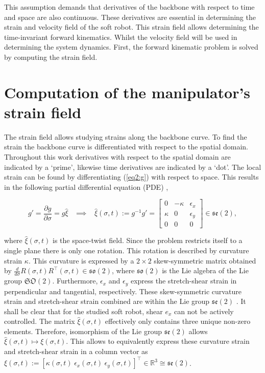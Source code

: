 This assumption demands that derivatives of the backbone with respect to time and space are also continuous. These derivatives are essential in determining the strain and velocity field of the soft robot. This strain field allows determining the time-invariant forward kinematics. Whilst the velocity field will be used in determining the system dynamics. First, the forward kinematic problem is solved by computing the strain field.



\section{Computation of the manipulator's strain field}

The strain field allows studying strains along the backbone curve. To find the strain the backbone curve is differentiated with respect to the spatial domain. Throughout this work derivatives with respect to the spatial domain are indicated by a `prime', likewise time derivatives are indicated by a `dot'. The local strain can be found by differentiating (\ref{eq2:g}) with respect to space. This results in the following partial differential equation (PDE) \cite{Caasenbrood2020}, 

\begin{equation}
   g' = \frac{\partial g}{\partial \sigma} = g \hat{\xi} \hspace{10pt} \implies \hspace{10pt}  \hat{\xi}(\sigma,t) := g^{-1}g' = \begin{bmatrix} 0 & -\kappa & \epsilon_x  \\ \kappa & 0 & \epsilon_y \\ 0 & 0 & 0 \end{bmatrix} \in  \mathfrak{se}(2),
    \label{eq2:dgdsigma}
\end{equation}

where $\hat{\xi}(\sigma,t)$ is the space-twist field. Since the problem restricts itself to a single plane there is only one rotation. This rotation is described by curvature strain $\kappa$. This curvature is expressed by a $2 \times 2$ skew-symmetric matrix obtained by $\frac{d}{d\sigma}R(\sigma,t)R^\top(\sigma,t) \in \mathfrak{so}(2)$, where $\mathfrak{so}(2)$ is the Lie algebra of the Lie group $\mathfrak{SO}(2)$. Furthermore, $\epsilon_x$ and $\epsilon_y$ express the stretch-shear strain in perpendicular and tangential, respectively. These skew-symmetric curvature strain and stretch-shear strain combined are within the Lie group $\mathfrak{se}(2)$ \cite{Sola2018}. It shall be clear that for the studied soft robot, shear $e_x$ can not be actively controlled. The matrix $\hat{\xi}(\sigma,t)$ effectively only contains three unique non-zero elements. Therefore, isomorphism of the Lie group $\mathfrak{se}(2)$ allows $\hat{\xi}(\sigma,t) \longmapsto \xi(\sigma,t)$. This allows to equivalently express these curvature strain and stretch-shear strain in a column vector as $\xi(\sigma,t):= [\kappa(\sigma,t) \hspace{3pt} \epsilon_x(\sigma,t) \hspace{3pt} \epsilon_y(\sigma,t) ]^\top \in \mathbb{R}^3 \cong \mathfrak{se}(2)$.

